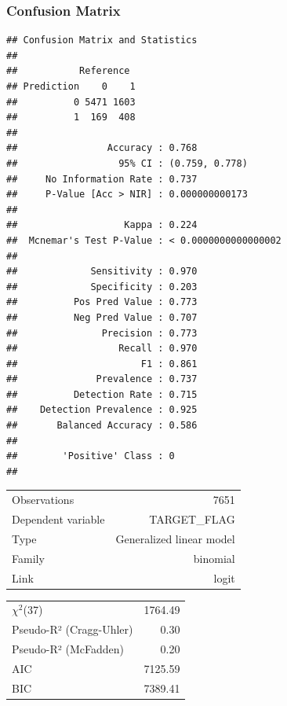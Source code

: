 \documentclass[]{article}
\begin{document}
\newpage

\subsubsection{Confusion Matrix}\label{confusion-matrix}

\begin{verbatim}
## Confusion Matrix and Statistics
## 
##           Reference
## Prediction    0    1
##          0 5471 1603
##          1  169  408
##                                               
##                Accuracy : 0.768               
##                  95% CI : (0.759, 0.778)      
##     No Information Rate : 0.737               
##     P-Value [Acc > NIR] : 0.000000000173      
##                                               
##                   Kappa : 0.224               
##  Mcnemar's Test P-Value : < 0.0000000000000002
##                                               
##             Sensitivity : 0.970               
##             Specificity : 0.203               
##          Pos Pred Value : 0.773               
##          Neg Pred Value : 0.707               
##               Precision : 0.773               
##                  Recall : 0.970               
##                      F1 : 0.861               
##              Prevalence : 0.737               
##          Detection Rate : 0.715               
##    Detection Prevalence : 0.925               
##       Balanced Accuracy : 0.586               
##                                               
##        'Positive' Class : 0                   
## 
\end{verbatim}

\begin{table}[!h]
\centering
\begin{tabular}{lr}
\toprule
\rowcolor{gray!6}  Observations & 7651\\
Dependent variable & TARGET\_FLAG\\
\rowcolor{gray!6}  Type & Generalized linear model\\
Family & binomial\\
\rowcolor{gray!6}  Link & logit\\
\bottomrule
\end{tabular}
\end{table}

\begin{table}[!h]
\centering
\begin{tabular}{lr}
\toprule
\rowcolor{gray!6}  $\chi^2$(37) & 1764.49\\
Pseudo-R² (Cragg-Uhler) & 0.30\\
\rowcolor{gray!6}  Pseudo-R² (McFadden) & 0.20\\
AIC & 7125.59\\
\rowcolor{gray!6}  BIC & 7389.41\\
\bottomrule
\end{tabular}
\end{table}
\end{document}
